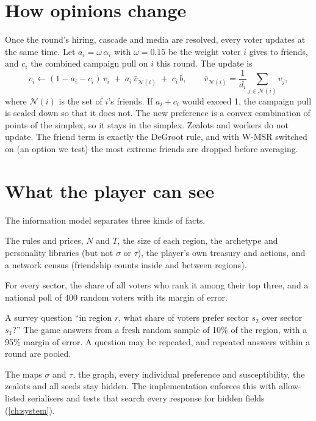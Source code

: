 \documentclass[11pt,a4paper,oneside]{report}
\newcommand{\coins}[1]{#1~coins}
\begin{document}
\section{How opinions change}

Once the round's hiring, cascade and media are resolved, every voter updates at the same time. Let
$a_i = \omega\,\alpha_i$ with $\omega = 0.15$ be the weight voter $i$ gives to friends, and $c_i$ the
combined campaign pull on $i$ this round. The update is
\begin{equation}\label{eq:update}
  v_i \leftarrow (1 - a_i - c_i)\,v_i \;+\; a_i\,\bar v_{\mathcal N(i)} \;+\; c_i\, b,
  \qquad
  \bar v_{\mathcal N(i)} = \frac{1}{d_i}\sum_{j \in \mathcal N(i)} v_j ,
\end{equation}
where $\mathcal N(i)$ is the set of $i$'s friends. If $a_i + c_i$ would exceed 1, the campaign pull is
scaled down so that it does not. The new preference is a convex combination of points of the simplex, so it
stays in the simplex. Zealots and workers do not update. The friend term is exactly the DeGroot rule, and
with W-MSR switched on (an option we test) the most extreme friends are dropped before averaging.

\section{What the player can see}

The information model separates three kinds of facts.
\begin{description}[leftmargin=0pt,style=nextline]
  \item[Public at all times.] The rules and prices, $N$ and $T$, the size of each region, the archetype
        and personality libraries (but not $\sigma$ or $\tau$), the player's own treasury and actions, and a
        network census (friendship counts inside and between regions).
  \item[Free each round.] For every sector, the share of all voters who rank it among their top three, and
        a national poll of 400 random voters with its margin of error.
  \item[Paid, \coins{10} each.] A survey question ``in region $r$, what share of voters prefer sector $s_2$
        over sector $s_1$?'' The game answers from a fresh random sample of 10\% of the region, with a
        95\% margin of error. A question may be repeated, and repeated answers within a round are pooled.
\end{description}
The maps $\sigma$ and $\tau$, the graph, every individual preference and susceptibility, the zealots and
all seeds stay hidden. The implementation enforces this with allow-listed serialisers and tests that search
every response for hidden fields (\cref{ch:system}).
\end{document}
